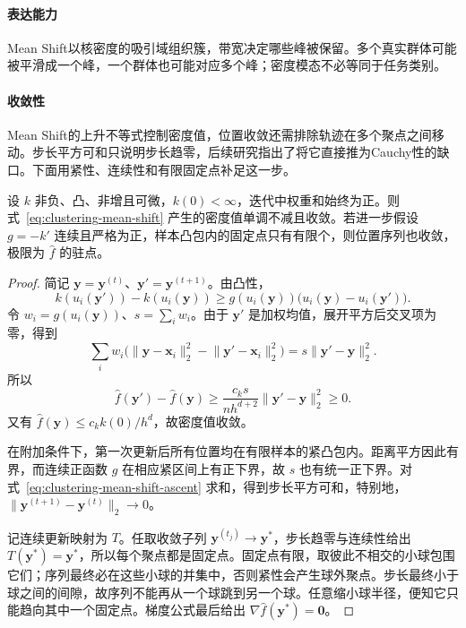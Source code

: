 \paragraph{表达能力}
Mean Shift以核密度的吸引域组织簇，带宽决定哪些峰被保留。多个真实群体可能被平滑成一个峰，一个群体也可能对应多个峰；密度模态不必等同于任务类别。

\paragraph{收敛性}
Mean Shift的上升不等式控制密度值，位置收敛还需排除轨迹在多个聚点之间移动。步长平方可和只说明步长趋零，后续研究指出了将它直接推为Cauchy性的缺口。下面用紧性、连续性和有限固定点补足这一步。

\begin{theorem}
 \label{thm:clustering-mean-shift}
 设 $k$ 非负、凸、非增且可微，$k(0)<\infty$，迭代中权重和始终为正。则式~\eqref{eq:clustering-mean-shift} 产生的密度值单调不减且收敛。若进一步假设 $g=-k'$ 连续且严格为正，样本凸包内的固定点只有有限个，则位置序列也收敛，极限为 $\hat f$ 的驻点。
\end{theorem}
\begin{proof}
简记 $\bm{y}=\bm{y}^{(t)}$、$\bm{y}'=\bm{y}^{(t+1)}$。由凸性，
\[
 k(u_i(\bm{y}'))-k(u_i(\bm{y}))
 \geq g(u_i(\bm{y}))
       \bigl(u_i(\bm{y})-u_i(\bm{y}')\bigr).
\]
令 $w_i=g(u_i(\bm{y}))$、$s=\sum_iw_i$。由于 $\bm{y}'$ 是加权均值，展开平方后交叉项为零，得到
\[
 \sum_iw_i\bigl(
 \lVert\bm{y}-\bm{x}_i\rVert_2^2
 -\lVert\bm{y}'-\bm{x}_i\rVert_2^2\bigr)
 =s\lVert\bm{y}'-\bm{y}\rVert_2^2.
\]
所以
\begin{equation}
 \hat f(\bm{y}')-\hat f(\bm{y})
 \geq\frac{c_k s}{nh^{d+2}}
       \lVert\bm{y}'-\bm{y}\rVert_2^2\geq0.
 \label{eq:clustering-mean-shift-ascent}
\end{equation}
又有 $\hat f(\bm{y})\leq c_k k(0)/h^d$，故密度值收敛。

在附加条件下，第一次更新后所有位置均在有限样本的紧凸包内。距离平方因此有界，而连续正函数 $g$ 在相应紧区间上有正下界，故 $s$ 也有统一正下界。对式~\eqref{eq:clustering-mean-shift-ascent} 求和，得到步长平方可和，特别地，$\lVert\bm{y}^{(t+1)}-\bm{y}^{(t)}\rVert_2\to0$。

记连续更新映射为 $T$。任取收敛子列 $\bm{y}^{(t_j)}\to\bm{y}^\ast$，步长趋零与连续性给出 $T(\bm{y}^\ast)=\bm{y}^\ast$，所以每个聚点都是固定点。固定点有限，取彼此不相交的小球包围它们；序列最终必在这些小球的并集中，否则紧性会产生球外聚点。步长最终小于球之间的间隙，故序列不能再从一个球跳到另一个球。任意缩小球半径，便知它只能趋向其中一个固定点。梯度公式最后给出 $\nabla\hat f(\bm{y}^\ast)=\bm{0}$。
\end{proof}

